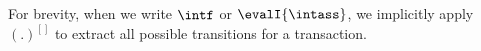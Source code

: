 For brevity, when we write \( \intf \) or \( \evalI{\intass} \), we implicitly apply \( (.)^{[]} \) to extract all possible transitions for a transaction.



